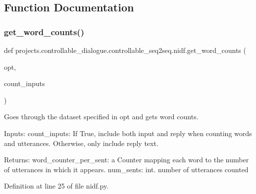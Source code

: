 \subsection{Function Documentation}
\mbox{\label{namespaceprojects_1_1controllable__dialogue_1_1controllable__seq2seq_1_1nidf_ad06ddb173f03a586d8c47c0c40f2f00c}} 
\subsubsection{\texorpdfstring{get\+\_\+word\+\_\+counts()}{get\_word\_counts()}}
{\footnotesize\ttfamily def projects.\+controllable\+\_\+dialogue.\+controllable\+\_\+seq2seq.\+nidf.\+get\+\_\+word\+\_\+counts (\begin{DoxyParamCaption}\item[{}]{opt,  }\item[{}]{count\+\_\+inputs }\end{DoxyParamCaption})}

\begin{DoxyVerb}Goes through the dataset specified in opt and gets word counts.

Inputs:
  count_inputs: If True, include both input and reply when counting words
    and utterances. Otherwise, only include reply text.

Returns:
  word_counter_per_sent: a Counter mapping each word to the number of
    utterances in which it appears.
  num_sents: int. number of utterances counted
\end{DoxyVerb}
 

Definition at line 25 of file nidf.\+py.


